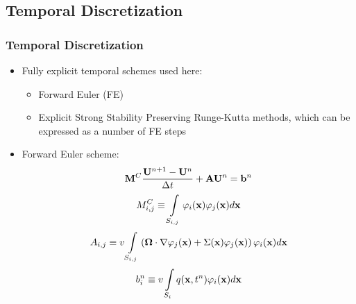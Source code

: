 \documentclass{beamer}
\begin{document}
\subsection{Temporal Discretization}
\begin{frame}
\frametitle{Temporal Discretization}

\begin{itemize}
   \item Fully explicit temporal schemes used here:
   \begin{itemize}
      \item Forward Euler (FE)
      \item Explicit Strong Stability Preserving Runge-Kutta methods,
         which can be expressed as a number of FE steps
   \end{itemize}
   \item Forward Euler scheme:
   \begin{equation}\label{eq:exgalerkin}
      \mathbf{M}^C\frac{\mathbf{U}^{n+1}-\mathbf{U}^n}{\Delta t} + \mathbf{A}\mathbf{U}^n = \mathbf{b}^n
   \end{equation}
   \begin{equation}
      M_{i,j}^C \equiv \int\limits_{S_{i,j}}\varphi_i(\mathbf{x}) \varphi_j(\mathbf{x}) d\mathbf{x}
   \end{equation}
   \begin{equation}
      A_{i,j} \equiv v\int\limits_{S_{i,j}}\left(
      \mathbf{\Omega}\cdot\nabla\varphi_j(\mathbf{x}) +
		\Sigma(\mathbf{x})\varphi_j(\mathbf{x})\right)\varphi_i(\mathbf{x}) d\mathbf{x}
   \end{equation}
   \begin{equation}
      b_i^n \equiv v\int\limits_{S_i} q(\mathbf{x},t^n)\varphi_i(\mathbf{x}) d\mathbf{x}
   \end{equation}
\end{itemize}

\end{frame}
\end{document}
